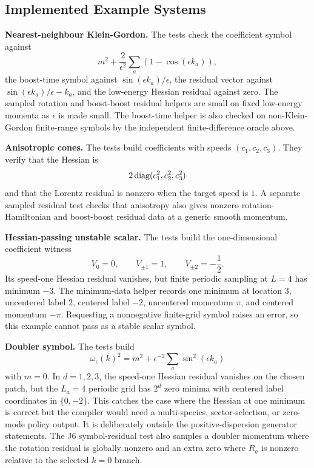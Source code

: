 \subsection{Implemented Example Systems}

\textbf{Nearest-neighbour Klein-Gordon.}  The tests check the coefficient
symbol against
\[
  m^2+\frac{2}{\epsilon^2}\sum_a(1-\cos(\epsilon k_a)),
\]
the boost-time symbol against \(\sin(\epsilon k_a)/\epsilon\), the residual
vector against \(\sin(\epsilon k_a)/\epsilon-k_a\), and the low-energy Hessian
residual against zero.  The sampled rotation and boost-boost residual helpers
are small on fixed low-energy momenta as \(\epsilon\) is made small.  The
boost-time helper is also checked on non-Klein-Gordon finite-range symbols by
the independent finite-difference oracle above.

\textbf{Anisotropic cones.}  The tests build coefficients with speeds
\((c_1,c_2,c_3)\).  They verify that the Hessian is
\[
  2\,{\rm diag}(c_1^2,c_2^2,c_3^2)
\]
and that the Lorentz residual is nonzero when the target speed is \(1\).  A
separate sampled residual test checks that anisotropy also gives nonzero
rotation-Hamiltonian and boost-boost residual data at a generic smooth momentum.

\textbf{Hessian-passing unstable scalar.}  The tests build the one-dimensional
coefficient witness
\[
  V_0=0,\qquad V_{\pm1}=1,\qquad V_{\pm2}=-\frac12.
\]
Its speed-one Hessian residual vanishes, but finite periodic sampling at
\(L=4\) has minimum \(-3\).  The minimum-data helper records one minimum at
location \(3\), uncentered label \(2\), centered label \(-2\), uncentered
momentum \(\pi\), and centered momentum \(-\pi\).  Requesting a nonnegative
finite-grid symbol raises an error, so this example cannot pass as a stable
scalar symbol.

\textbf{Doubler symbol.}  The tests build
\[
  \omega_\epsilon(k)^2
  =
  m^2+\epsilon^{-2}\sum_a\sin^2(\epsilon k_a)
\]
with \(m=0\).  In \(d=1,2,3\), the speed-one Hessian residual vanishes on the
chosen patch, but the \(L_a=4\) periodic grid has \(2^d\) zero minima with
centered label coordinates in \(\{0,-2\}\).  This catches the case where the
Hessian at one minimum is correct but the compiler would need a multi-species,
sector-selection, or zero-mode policy output.  It is deliberately outside the
positive-dispersion generator statements.  The J6 symbol-residual test also
samples a doubler momentum where the rotation residual is globally nonzero and
an extra zero where \(R_a\) is nonzero relative to the selected \(k=0\) branch.

